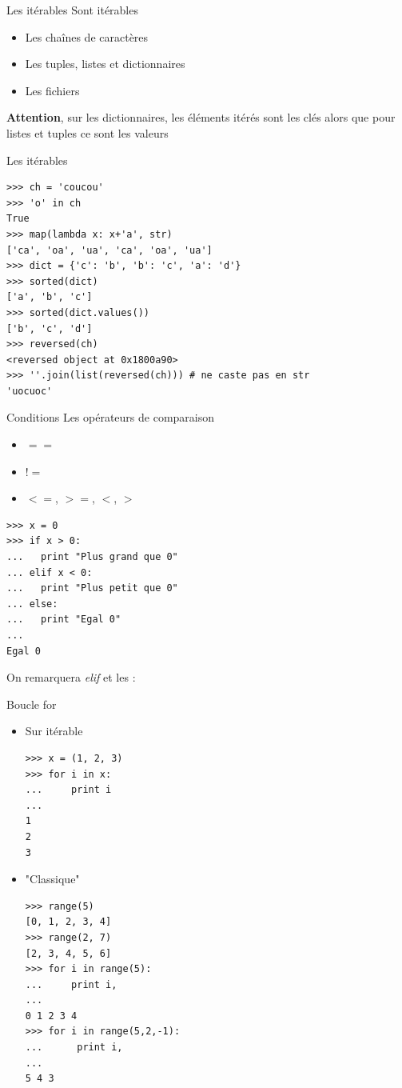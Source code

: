 \documentclass{beamer}
\begin{document}
\begin{frame}[fragile]{Les itérables}
Sont itérables
\begin{itemize}
 \item Les chaînes de caractères
 \item Les tuples, listes et dictionnaires
 \item Les fichiers
\end{itemize}

\textbf{Attention}, sur les dictionnaires, les éléments itérés sont les clés alors que pour listes et tuples ce sont les valeurs

\end{frame}

\begin{frame}[fragile]{Les itérables}
\begin{lstlisting}
>>> ch = 'coucou'
>>> 'o' in ch
True
>>> map(lambda x: x+'a', str)
['ca', 'oa', 'ua', 'ca', 'oa', 'ua']
>>> dict = {'c': 'b', 'b': 'c', 'a': 'd'}
>>> sorted(dict)
['a', 'b', 'c']
>>> sorted(dict.values())
['b', 'c', 'd']
>>> reversed(ch)
<reversed object at 0x1800a90>
>>> ''.join(list(reversed(ch))) # ne caste pas en str
'uocuoc'
\end{lstlisting}
\end{frame}


\begin{frame}[fragile]{Conditions}
Les opérateurs de comparaison
\begin{itemize}
 \item $==$
 \item $!=$
 \item $<=$, $>=$, $<$, $>$
\end{itemize}

\begin{lstlisting}
>>> x = 0
>>> if x > 0:
...   print "Plus grand que 0"
... elif x < 0:
...   print "Plus petit que 0"
... else:
...   print "Egal 0"
... 
Egal 0
\end{lstlisting}

On remarquera \textit{elif} et les :

\end{frame}


\begin{frame}[fragile]{Boucle for}
\begin{itemize}
 \item Sur itérable
\begin{lstlisting}[multicols=2]
>>> x = (1, 2, 3)
>>> for i in x:
...     print i
... 
1
2
3
\end{lstlisting}

 \item "Classique"
\begin{lstlisting}[multicols=2]
>>> range(5)
[0, 1, 2, 3, 4]
>>> range(2, 7)
[2, 3, 4, 5, 6]
>>> for i in range(5):
...     print i,
... 
0 1 2 3 4
>>> for i in range(5,2,-1):
...      print i,
... 
5 4 3
\end{lstlisting}

\end{itemize}

\end{frame}
\end{document}
